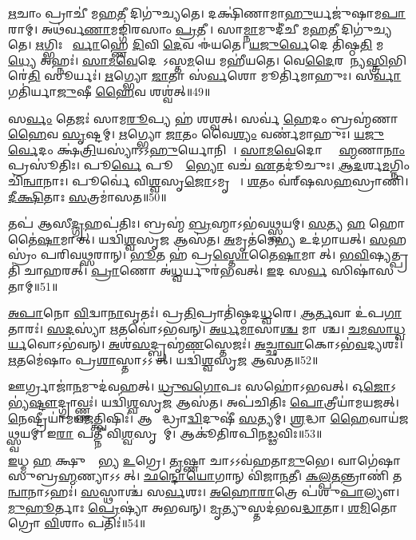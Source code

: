    \ul{𑌋}𑌚𑌾𑌂 𑌪𑍍𑌰𑌾𑌚𑍀॑ 𑌮\ul{𑌹}𑌤𑍀 𑌦𑌿𑌗𑍁॑𑌚𑍍𑌯𑌤𑍇।
   𑌦𑌕𑍍𑌷𑌿॑𑌣𑌾𑌮𑌾\ul{𑌹𑍁}𑌰𑍍𑌯𑌜𑍁॑𑌷𑌾𑌮\ul{𑌪𑌾}𑌰𑌾𑌮𑍍।
   𑌅𑌥॑𑌰𑍍𑌵\ul{𑌣𑌾}𑌮𑌙𑍍𑌗𑌿॑𑌰𑌸𑌾𑌂 \ul{𑌪𑍍𑌰}𑌤𑍀𑌚𑍀᳚।
   𑌸𑌾\ul{𑌮𑍍𑌨𑌾}𑌮𑍁𑌦𑍀॑𑌚𑍀 𑌮\ul{𑌹}𑌤𑍀 𑌦𑌿𑌗𑍁॑𑌚𑍍𑌯𑌤𑍇।
   \ul{𑌋}𑌗𑍍𑌭𑌿𑌃 𑌪𑍂᳚\ul{𑌰𑍍𑌵𑌾}𑌹𑍍𑌣𑍇 \ul{𑌦𑌿}𑌵𑌿 \ul{𑌦𑍇}𑌵 𑌈॑𑌯𑌤𑍇।
   \ul{𑌯}\ul{𑌜𑍁}\ul{𑌰𑍍𑌵𑍇}𑌦𑍇 𑌤𑌿॑𑌷𑍍𑌠\ul{𑌤𑌿} 𑌮\ul{𑌧𑍍𑌯𑍇} 𑌅𑌹𑍍𑌨𑌃॑।
   \ul{𑌸𑌾}\ul{𑌮}\ul{𑌵𑍇}𑌦𑍇𑌨𑌾᳚𑌽𑌸𑍍𑌤\ul{𑌮}𑌯𑍇 𑌮𑌹𑍀॑𑌯𑌤𑍇।
   𑌵𑍇\ul{𑌦𑍈}𑌰𑌶𑍂᳚𑌨𑍍𑌯\ul{𑌸𑍍𑌤𑍍𑌰𑌿}𑌭𑌿𑌰𑍇॑\ul{𑌤𑌿} 𑌸𑍂𑌰𑍍𑌯𑌃॑।
   \ul{𑌋}𑌗𑍍𑌭𑍍𑌯𑍋 \ul{𑌜𑌾}𑌤𑌾 𑌸॑\ul{𑌰𑍍𑌵}𑌶𑍋 𑌮𑍂𑌰𑍍𑌤𑌿॑𑌮𑌾𑌹𑍁𑌃।
   𑌸\ul{𑌰𑍍𑌵𑌾} 𑌗𑌤𑌿॑𑌰𑍍𑌯𑌾\ul{𑌜𑍁}𑌷𑍀 \ul{𑌹𑍈}𑌵 𑌶𑌶𑍍𑌵॑𑌤𑍍॥49॥

   𑌸\ul{𑌰𑍍𑌵𑌂} 𑌤𑍇𑌜𑌃॑ 𑌸𑌾𑌮\ul{𑌰𑍂}𑌪𑍍𑌯 𑌹॑ 𑌶𑌶𑍍𑌵𑌤𑍍।
   𑌸𑌰𑍍𑌵॑ \ul{𑌹𑍇}𑌦𑌂 𑌬𑍍𑌰𑌹𑍍𑌮॑𑌣𑌾 \ul{𑌹𑍈}𑌵 \ul{𑌸𑍃}𑌷𑍍𑌟𑌮𑍍।
   \ul{𑌋}𑌗𑍍𑌭𑍍𑌯𑍋 \ul{𑌜𑌾}𑌤𑌂 𑌵𑍈\ul{𑌶𑍍𑌯𑌂} 𑌵𑌰𑍍𑌣॑𑌮𑌾𑌹𑍁𑌃।
   \ul{𑌯}\ul{𑌜𑍁}\ul{𑌰𑍍𑌵𑍇}𑌦𑌂 𑌕𑍍𑌷॑\ul{𑌤𑍍𑌰𑌿}𑌯𑌸𑍍𑌯𑌾॑𑌽𑌽\ul{𑌹𑍁}𑌰𑍍𑌯𑍋𑌨𑌿𑌮𑍍᳚।
   \ul{𑌸𑌾}\ul{𑌮}\ul{𑌵𑍇}𑌦𑍋 𑌬𑍍𑌰𑌾᳚\ul{𑌹𑍍𑌮}𑌣𑌾\ul{𑌨𑌾𑌂} 𑌪𑍍𑌰𑌸𑍂॑𑌤𑌿𑌃।
   𑌪𑍂\ul{𑌰𑍍𑌵𑍇} 𑌪𑍂𑌰𑍍𑌵𑍇᳚\ul{𑌭𑍍𑌯𑍋} 𑌵𑌚॑ \ul{𑌏}𑌤𑌦𑍂॑𑌚𑍁𑌃।
   \ul{𑌆}\ul{𑌦}𑌰𑍍\mbox{}𑌶\ul{𑌮}𑌗𑍍𑌨𑌿𑌂 𑌚𑌿॑\ul{𑌨𑍍𑌵𑌾}𑌨𑌾𑌃।
   𑌪𑍂𑌰𑍍𑌵𑍇॑ 𑌵𑌿\ul{𑌶𑍍𑌵}𑌸𑍃\ul{𑌜𑍋}𑌽𑌮𑍃𑌤𑌾𑌃᳚।
   \ul{𑌶}𑌤𑌂 𑌵॑𑌰𑍍‌𑌷𑌸\ul{𑌹}𑌸𑍍𑌰𑌾𑌣𑌿॑।
   \ul{𑌦𑍀}\ul{𑌕𑍍𑌷𑌿}𑌤𑌾𑌃 \ul{𑌸}𑌤𑍍𑌰𑌮𑌾॑𑌸𑌤॥50॥

   𑌤𑌪॑ 𑌆𑌸𑍀\ul{𑌦𑍍𑌗𑍃}𑌹𑌪॑𑌤𑌿𑌃।
   𑌬𑍍𑌰𑌹𑍍𑌮॑ \ul{𑌬𑍍𑌰}𑌹𑍍𑌮𑌾𑌽𑌭॑𑌵\ul{𑌥𑍍𑌸𑍍𑌵}𑌯𑌮𑍍।
   \ul{𑌸}𑌤𑍍𑌯 \ul{𑌹} 𑌹𑍋𑌤𑍈॑\ul{𑌷𑌾}𑌮𑌾𑌸𑍀᳚𑌤𑍍।
   𑌯𑌦𑍍𑌵𑌿॑\ul{𑌶𑍍𑌵}𑌸𑍃\ul{𑌜} 𑌆𑌸॑𑌤।
   \ul{𑌅}𑌮𑍃𑌤॑𑌮𑍇\ul{𑌭𑍍𑌯} 𑌉𑌦॑𑌗𑌾𑌯𑌤𑍍।
   \ul{𑌸}𑌹𑌸𑍍𑌰𑌂॑ 𑌪𑌰𑌿𑌵\ul{𑌥𑍍𑌸}𑌰𑌾𑌨𑍍।
   \ul{𑌭𑍂}𑌤 𑌹॑ 𑌪𑍍𑌰\ul{𑌸𑍍𑌤𑍋}𑌤𑍈\ul{𑌷𑌾}𑌮𑌾𑌸𑍀᳚𑌤𑍍।
   \ul{𑌭}\ul{𑌵𑌿}𑌷𑍍𑌯𑌤𑍍𑌪𑍍𑌰𑌤𑌿॑ 𑌚𑌾𑌹𑌰𑌤𑍍।
   \ul{𑌪𑍍𑌰𑌾}𑌣𑍋 𑌅॑\ul{𑌧𑍍𑌵}𑌰𑍍𑌯𑍁𑌰॑𑌭𑌵𑌤𑍍।
   \ul{𑌇}𑌦 𑌸\ul{𑌰𑍍𑌵}\ul{} 𑌸𑌿𑌷𑌾॑𑌸𑌤𑌾𑌮𑍍॥51॥

   \ul{𑌅}\ul{𑌪𑌾}𑌨𑍋 \ul{𑌵𑌿}𑌦𑍍𑌵𑌾\ul{𑌨𑌾}𑌵𑍃𑌤𑌃॑।
   𑌪𑍍𑌰\ul{𑌤𑌿}𑌪𑍍𑌰𑌾𑌤𑌿॑𑌷𑍍𑌠𑌦\ul{𑌧𑍍𑌵}𑌰𑍇।
   \ul{𑌆}\ul{𑌰𑍍𑌤}𑌵𑌾 𑌉॑𑌪\ul{𑌗𑌾}𑌤𑌾𑌰𑌃॑।
   \ul{𑌸}\ul{𑌦}𑌸𑍍𑌯𑌾॑ \ul{𑌋}𑌤𑌵𑍋॑𑌽𑌭𑌵𑌨𑍍।
   \ul{𑌅}\ul{𑌰𑍍𑌧}\ul{𑌮𑌾}𑌸𑌾\ul{𑌶𑍍𑌚} 𑌮𑌾𑌸𑌾᳚𑌶𑍍𑌚।
   \ul{𑌚}\ul{𑌮}\ul{𑌸𑌾}\ul{𑌧𑍍𑌵}\ul{𑌰𑍍𑌯}𑌵𑍋𑌽𑌭॑𑌵𑌨𑍍।
   \ul{𑌅}𑌶॑\ul{𑌸}𑌦𑍍𑌬𑍍𑌰𑌹𑍍𑌮॑\ul{𑌣}𑌸𑍍𑌤𑍇𑌜𑌃॑।
   \ul{𑌅}\ul{𑌚𑍍𑌛𑌾}\ul{𑌵𑌾}𑌕𑍋𑌽𑌭॑\ul{𑌵}𑌦𑍍𑌯𑌶𑌃॑।
   \ul{𑌋}𑌤𑌮𑍇॑𑌷𑌾𑌂 𑌪𑍍𑌰\ul{𑌶𑌾}𑌸𑍍𑌤𑌾𑌽𑌽𑌸𑍀᳚𑌤𑍍।
   𑌯𑌦𑍍𑌵𑌿॑\ul{𑌶𑍍𑌵}𑌸𑍃\ul{𑌜} 𑌆𑌸॑𑌤॥52॥

   𑌊𑌰𑍍𑌗𑍍𑌰𑌾𑌜𑌾॑\ul{𑌨}𑌮𑍁𑌦॑𑌵𑌹𑌤𑍍।
   \ul{𑌧𑍍𑌰𑍁}\ul{𑌵}\ul{𑌗𑍋}𑌪𑌃 𑌸𑌹𑍋॑𑌽𑌭𑌵𑌤𑍍।
   𑌓\ul{𑌜𑍋}𑌽𑌭𑍍𑌯॑\ul{𑌷𑍍𑌟𑍗}\-𑌦𑍍𑌗𑍍𑌰𑌾𑌵𑍍𑌣𑍍𑌣𑌃॑।
   𑌯𑌦𑍍𑌵𑌿॑\ul{𑌶𑍍𑌵}𑌸𑍃\ul{𑌜} 𑌆𑌸॑𑌤।
   𑌅𑌪॑𑌚𑌿𑌤𑌿𑌃 \ul{𑌪𑍋}𑌤𑍍𑌰𑍀𑌯𑌾॑𑌮𑌯𑌜𑌤𑍍।
   \ul{𑌨𑍇}𑌷𑍍𑌟𑍍𑌰𑍀𑌯𑌾॑𑌮\-𑌯\ul{𑌜}𑌤𑍍𑌤𑍍𑌵𑌿𑌷𑌿𑌃॑।
   𑌆𑌗𑍍𑌨𑍀᳚𑌦𑍍𑌧𑍍𑌰𑌾\ul{𑌦𑍍𑌵𑌿}𑌦𑍁𑌷𑍀॑ \ul{𑌸}𑌤𑍍𑌯𑌮𑍍।
   \ul{𑌶𑍍𑌰}𑌦𑍍𑌧𑌾 \ul{𑌹𑍈}𑌵𑌾𑌯॑𑌜\ul{𑌥𑍍𑌸𑍍𑌵}𑌯𑌮𑍍।
   𑌇\ul{𑌰𑌾} 𑌪𑌤𑍍𑌨𑍀॑ 𑌵𑌿\ul{𑌶𑍍𑌵}𑌸𑍃𑌜𑌾᳚𑌮𑍍।
   𑌆𑌕𑍂॑𑌤𑌿𑌰𑌪𑌿𑌨\-\ul{𑌡𑍍𑌢}𑌵𑌿𑌃॥53॥

   \ul{𑌇}𑌧𑍍𑌮 \ul{𑌹} 𑌕𑍍𑌷𑍁𑌚𑍍𑌚𑍈᳚𑌭𑍍𑌯 \ul{𑌉}𑌗𑍍𑌰𑍇।
   \ul{𑌤𑍃}𑌷𑍍𑌣𑌾 𑌚𑌾𑌽𑌽𑌵॑𑌹𑌤𑌾\ul{𑌮𑍁}𑌭𑍇।
   𑌵𑌾𑌗𑍇॑𑌷𑌾 𑌸𑍁𑌬𑍍𑌰\ul{𑌹𑍍𑌮}𑌣𑍍𑌯𑌾𑌽𑌽𑌸𑍀᳚𑌤𑍍।
   \ul{𑌛}\ul{𑌨𑍍𑌦𑍋}\ul{𑌯𑍋}𑌗𑌾𑌨𑍍 𑌵𑌿॑𑌜𑌾\ul{𑌨}𑌤𑍀।
   \ul{𑌕}\ul{𑌲𑍍𑌪}\ul{𑌤}𑌨𑍍𑌤𑍍𑌰𑌾𑌣𑌿॑ 𑌤\ul{𑌨𑍍𑌵𑌾}𑌨𑌾𑌽𑌹𑌃॑।
   \ul{𑌸}\ul{}𑌸𑍍𑌥𑌾𑌶𑍍𑌚॑ 𑌸\ul{𑌰𑍍𑌵}𑌶𑌃।
   \ul{𑌅}\ul{𑌹𑍋}\ul{𑌰𑌾}𑌤𑍍𑌰𑍇 𑌪॑𑌶𑍁\ul{𑌪𑌾}𑌲𑍍𑌯𑍗।
   \ul{𑌮𑍁}\ul{𑌹𑍂}𑌰𑍍𑌤𑌾𑌃 \ul{𑌪𑍍𑌰𑍇}𑌷𑍍𑌯𑌾॑ 𑌅𑌭𑌵𑌨𑍍।
   \ul{𑌮𑍃}𑌤𑍍𑌯𑍁𑌸𑍍𑌤𑌦॑𑌭𑌵\ul{𑌦𑍍𑌧𑌾}𑌤𑌾।
   \ul{𑌶}\ul{𑌮𑌿}𑌤𑍋𑌗𑍍𑌰𑍋 \ul{𑌵𑌿}𑌶𑌾𑌂 𑌪𑌤𑌿𑌃॑॥54॥

